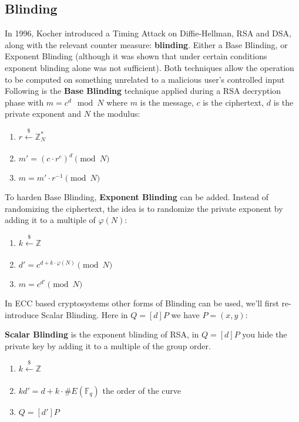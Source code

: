 \documentclass[a4paper,11pt]{article}
\begin{document}
\subsection{Blinding}

In 1996, Kocher\cite{Kocher} introduced a Timing Attack on Diffie-Hellman, RSA and DSA, along with the relevant counter measure: \textbf{blinding}. Either a Base Blinding, or Exponent Blinding (although it was shown that under certain conditions exponent blinding alone was not sufficient\cite{schindler}). Both techniques allow the operation to be computed on something unrelated to a malicious user's controlled input\\

Following is the \textbf{Base Blinding} technique applied during a RSA decryption phase with $m = c^d \mod{N}$ where $m$ is the message, $c$ is the ciphertext, $d$ is the private exponent and $N$ the modulus:

\begin{enumerate}
\item{$r  \xleftarrow[]{\$} \mathbb{Z}_N^{\ast}$}
\item{$m' = (c \cdot r^e)^d \pmod{N}$}
\item{$m = m' \cdot r^{-1} \pmod{N}$}
\end{enumerate}

To harden Base Blinding, \textbf{Exponent Blinding} can be added. Instead of randomizing the ciphertext, the idea is to randomize the private exponent by adding it to a multiple of $\varphi(N)$:

\begin{enumerate}
    \item{$k \xleftarrow[]{\$} \mathbb{Z}$}
    \item{$d' = c^{d + k \cdot \varphi(N)} \pmod{N}$}
    \item{$m = c^{d'} \pmod{N}$}
\end{enumerate}

In ECC based cryptosystems other forms of Blinding can be used, we'll first re-introduce Scalar Blinding. Here in $Q = [d]P$ we have $P=(x,y)$:

\textbf{Scalar Blinding} is the exponent blinding of RSA, in $Q = [d]P$ you hide the private key by adding it to a multiple of the group order.

\begin{enumerate}
\item{$k \xleftarrow[]{\$} \mathbb{Z}$}
\item{$k d' = d + k \cdot \#E(\mathbb{F}_q)$ the order of the curve}
\item{$Q = [d']P$}
\end{enumerate}
\end{document}
